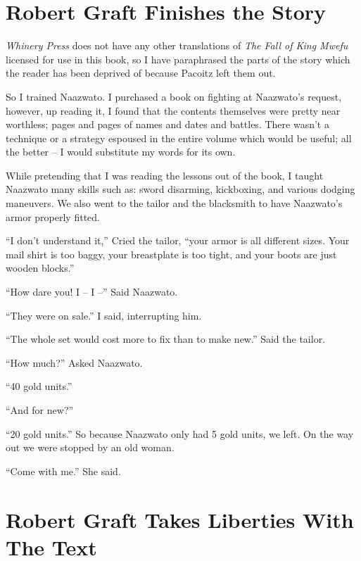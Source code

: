 \chapter{Robert Graft Finishes the Story}
\emph{Whinery Press} does not have any other translations of \emph{The Fall of King Mwefu} licensed for use in this book, so I have paraphrased the parts of the story which the reader has been deprived of because Pacoitz left them out.

So I trained Naazwato. I purchased a book on fighting at Naazwato's request, however, up reading it, I found that the contents themselves were pretty near worthless; pages and pages of names and dates and battles. There wasn't a technique or a strategy espoused in the entire volume which would be useful; all the better -- I would substitute my words for its own.

While pretending that I was reading the lessons out of the book, I taught Naazwato many skills such as: sword disarming, kickboxing, and various dodging maneuvers.  We also went to the tailor and the blacksmith to have Naazwato's armor properly fitted.

``I don't understand it,'' Cried the tailor, ``your armor is all different sizes. Your mail shirt is too baggy, your breastplate is too tight, and your boots are just wooden blocks.''

``How dare you! I -- I --'' Said Naazwato.

``They were on sale.'' I said, interrupting him.

``The whole set would cost more to fix than to make new.'' Said the tailor.

``How much?'' Asked Naazwato.

``40 gold units.'' 

``And for new?''

``20 gold units.'' So because Naazwato only had 5 gold units, we left. On the way out we were stopped by an old woman.

``Come with me.'' She said.

\chapter{Robert Graft Takes Liberties With The Text}
